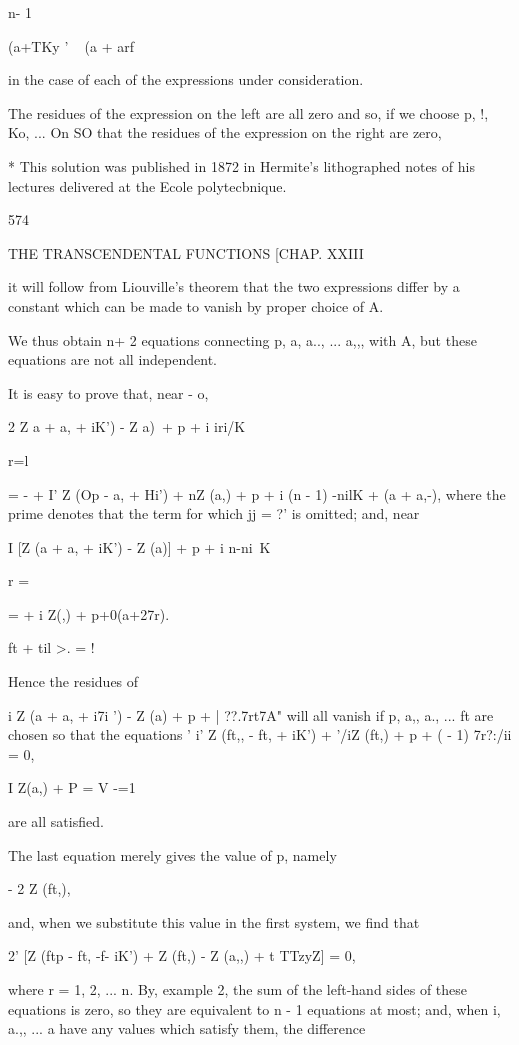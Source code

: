 {{{{{{{{n- 1

(a+TKy ' ~ (a + arf

in the case of each of the expressions under consideration.

The residues of the expression on the left are all zero and so, if we
choose p, !, Ko, ... On SO that the residues of the expression on the
right are zero,

* This solution was published in 1872 in Hermite's lithographed notes
of his lectures delivered at the Ecole polytecbnique.

574

THE TRANSCENDENTAL FUNCTIONS [CHAP. XXIII

it will follow from Liouville's theorem that the two expressions
differ by a constant which can be made to vanish by proper choice of
A.

We thus obtain n+ 2 equations connecting p, a, a.., ... a,,, with A,
but these equations are not all independent.

It is easy to prove that, near - o,

2 Z a + a, + iK') - Z a)\ + p + i iri/K

r=l

= - + I' Z (Op - a, + Hi') + nZ (a,) + p + i (n - 1) -nilK + (a +
a,-), where the prime denotes that the term for which jj = ?' is
omitted; and, near

I [Z (a + a, + iK') - Z (a)] + p + i n-ni\ K

r = \

= + i Z(,) + p+0(a+27r).

ft + til >. = !

Hence the residues of

i Z (a + a, + i7i ') - Z (a) + p + | ??.7rt7A" will all vanish if p,
a,, a., ... ft are chosen so that the equations ' i' Z (ft,, - ft, +
iK') + '/iZ (ft,) + p + ( - 1) 7r?:/ii = 0,

I Z(a,) + P = V -=1

are all satisfied.

The last equation merely gives the value of p, namely

- 2 Z (ft,),

and, when we substitute this value in the first system, we find that

2' [Z (ftp - ft, -f- iK') + Z (ft,) - Z (a,,) + t TTzyZ] = 0,

where r = 1, 2, ... n. By, example 2, the sum of the
left-hand sides of these equations is zero, so they are equivalent to
n - 1 equations at most; and, when i, a.,, ... a have any values
which satisfy them, the difference

}}}}}}}}
